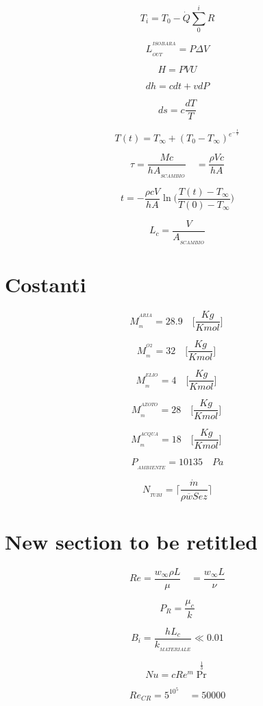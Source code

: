 \documentclass[portrait,a4paper]{article}
\begin{document}
\begin{multicols}{3}
\[ T_{i} = T_{0} - \dot Q \sum _{0}^{i} R \]	





\[L_{_{OUT}}^{^{ISOBARA}}= P \Delta V \]

\[ H = PVU \]

\[ dh = cdt + vdP \]
	
\[ds= c \frac{dT}{T}\]

\[T(t) = T_{\infty} + {(T_0-T_\infty)}^{e^{- \frac{t}{T}} }\]

\[ \tau = \frac {Mc}{hA_{_{SCAMBIO}}} \quad   = \frac{\rho Vc}{hA} \]

\[t = -  \frac {\rho cV}{hA} \ln \bigg ( \frac {T(t)-T_{\infty}}{T(0)-T_{\infty}}  \bigg )\]

\[ L_{c} = \frac {V}{A_{_{SCAMBIO}}} \]

\section{Costanti}


\[ M_{_{m}}^{^{ARIA}} = 28.9 \quad \Big [ \frac {Kg}{Kmol} \Big ] \ \]

\[ M_{_{m}}^{^{O2}} = 32 \quad \Big [ \frac {Kg}{Kmol} \Big ] \ \]

\[ M_{_{m}}^{^{ELIO}} = 4 \quad \Big [ \frac {Kg}{Kmol} \Big ] \ \]

\[ M_{_{m}}^{^{AZOTO}} = 28 \quad \Big [ \frac {Kg}{Kmol} \Big ] \ \]

\[ M_{_{m}}^{^{ACQUA}} = 18 \quad \Big [ \frac {Kg}{Kmol} \Big ] \ \]

\[ P_{_{AMBIENTE}} = 10135  \quad Pa \]

\[ N_{_{TUBI}} = \Bigg \lceil \frac {\dot m}{\rho \overline w Sez} \Bigg \rceil \]


\section{New section to be retitled}

\[ Re = \frac {w_{\infty} \rho L}{\mu} \quad   = \frac{w_{\infty} L}{\nu} \]

\[ P_{R} = \frac {\mu_{c}}{k} \]




\[ B_{i} = \frac {hL_{c}}{k_{_{MATERIALE}}} \ll 0.01\]


\[ Nu = cRe^{m} \Pr^{\frac {1}{3}} \]

\[ Re_{CR} = 5^{10^{5}} \quad =50000 \]




\end{multicols}
\end{document}
